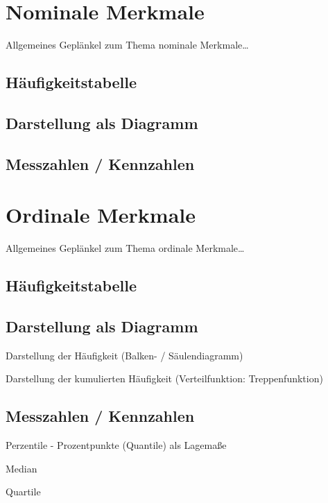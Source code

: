 
\section{Nominale Merkmale}
Allgemeines Geplänkel zum Thema nominale Merkmale\ldots

\subsection{Häufigkeitstabelle}

\subsection{Darstellung als Diagramm}

\subsection{Messzahlen / Kennzahlen}


\section{Ordinale Merkmale}
Allgemeines Geplänkel zum Thema ordinale Merkmale\ldots
\subsection{Häufigkeitstabelle}

\subsection{Darstellung als Diagramm}
Darstellung der Häufigkeit (Balken- / Säulendiagramm)

Darstellung der kumulierten Häufigkeit (Verteilfunktion: Treppenfunktion)

\subsection{Messzahlen / Kennzahlen}

Perzentile - Prozentpunkte (Quantile) als Lagemaße

Median
 
Quartile
